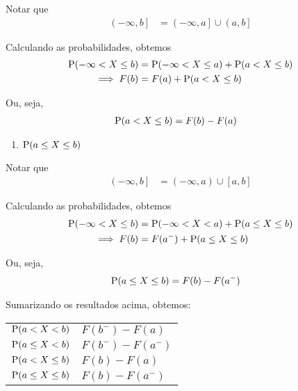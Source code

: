 \begin{example}
    Notar que
    \begin{align*}
        \left(-\infty, b\right]
        &= \left(-\infty, a\right] \cup \left(a, b\right]
    \end{align*}

    Calculando as probabilidades, obtemos
    \begin{align*}
        \operatorname{P}(-\infty < X \leq b)
        &= \operatorname{P}(-\infty < X \leq a)
        + \operatorname{P}(a < X \leq b) \\
        \implies F(b) &= F(a) + \operatorname{P}(a < X \leq b)
    \end{align*}
    
    Ou, seja,
    \begin{align*}
        \operatorname{P}(a < X \leq b) &= F(b) - F(a)
    \end{align*}

    \begin{enumerate}[resume]
        \item $\operatorname{P}(a \leq X \leq b)$
    \end{enumerate}

    Notar que
    \begin{align*}
        \left(-\infty, b\right]
        &= \left(-\infty, a\right) \cup \left[a, b\right]
    \end{align*}
    
    Calculando as probabilidades, obtemos
    \begin{align*}
        \operatorname{P}(-\infty < X \leq b)
        &= \operatorname{P}(-\infty < X < a)
        + \operatorname{P}(a \leq X \leq b) \\
        \implies F(b) &= F(a^-) + \operatorname{P}(a \leq X \leq b)
    \end{align*}
    
    Ou, seja,
    \begin{align*}
        \operatorname{P}(a \leq X \leq b) &= F(b) - F(a^-)
    \end{align*}

    Sumarizando os resultados acima, obtemos:
    \begin{center}
        \begin{tabular}{cl}
            \toprule
             $\operatorname{P}(a < X < b)$       & $F(b^-) - F(a)$   \\
             $\operatorname{P}(a \leq X < b)$    & $F(b^-) - F(a^-)$ \\
             $\operatorname{P}(a < X \leq b)$    & $F(b) - F(a)$     \\
             $\operatorname{P}(a \leq X \leq b)$ & $F(b) - F(a^-)$   \\
             \bottomrule
        \end{tabular}
    \end{center}
\end{example}

